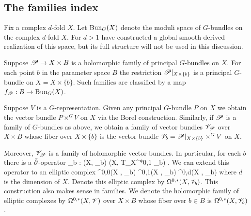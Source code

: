 \subsection{The families index}

Fix a complex $d$-fold $X$. 
Let ${\rm Bun}_{G}(X)$ denote the moduli space of $G$-bundles on the complex $d$-fold $X$. 
For $d > 1$ \cite{FHK} have constructed a global smooth derived realization of this space, but its full structure will not be used in this discussion. 

Suppose $\mathscr P \to X \times B$ is a holomorphic family of principal $G$-bundles on $X$. 
For each point $b$ in the parameter space $B$ the restriction $\mathscr P|_{X \times \{b\}}$ is a principal $G$-bundle on $X = X \times \{b\}$. 
Such families are classified by a map $f_{\mathscr P} : B \to {\rm Bun}_G(X)$.

Suppose $V$ is a $G$-representation. 
Given any principal $G$-bundle $P$ on $X$ we obtain the vector bundle $P \times^G V$ on $X$ via the Borel construction. 
Similarly, if $\mathscr P$ is a family of $G$-bundles as above, we obtain a family of vector bundles $\mathscr V_\mathscr P$ over $X \times B$ whose fiber over $X \times \{b\}$ is the vector bundle $\mathscr V_b = \mathscr P|_{X \times \{b\}} \times^G V$ on $X$.

Moreover, $\mathscr V_\mathscr P$ is a family of holomorphic vector bundles. 
In particular, for each $b$ there is a $\Bar{\partial}$-operator
\ben
\dbar_b : \Gamma(X, \sV_b) \to \Gamma(X, T_X^{*0,1} \tensor \sV_b) .
\een
We can extend this operator to an elliptic complex 
\ben
\Omega^{0,0}(X , \sV_b)  \Omega^{0,1}(X , \sV_b)  \cdots {} \Omega^{0,d}(X , \sV_b)
\een
where $d$ is the dimension of $X$. 
Denote this elliptic complex by $\Omega^{0,*}(X , \mathscr V_b)$. 
This construction also makes sense in families.
We denote the holomorphic family of elliptic complexes by $\Omega^{0,*}(X , \mathscr V)$ over $X \times B$ whose fiber over $b \in B$ is $\Omega^{0,*}(X , \mathscr V_b)$.

%

